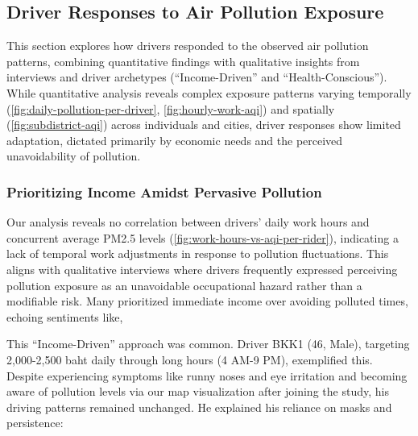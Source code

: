 \subsection{Driver Responses to Air Pollution Exposure}
This section explores how drivers responded to the observed air pollution patterns, combining quantitative findings with qualitative insights from interviews and driver archetypes (``Income-Driven'' and ``Health-Conscious'').
While quantitative analysis reveals complex exposure patterns varying temporally (\autoref{fig:daily-pollution-per-driver}, \autoref{fig:hourly-work-aqi}) and spatially (\autoref{fig:subdistrict-aqi}) across individuals and cities,
driver responses show limited adaptation, dictated primarily by economic needs and the perceived unavoidability of pollution.

\subsubsection{Prioritizing Income Amidst Pervasive Pollution}
Our analysis reveals no correlation between drivers' daily work hours and concurrent average PM2.5 levels (\autoref{fig:work-hours-vs-aqi-per-rider}), indicating a lack of temporal work adjustments in response to pollution fluctuations.
This aligns with qualitative interviews where drivers frequently expressed perceiving pollution exposure as an unavoidable occupational hazard rather than a modifiable risk.
Many prioritized immediate income over avoiding polluted times, echoing sentiments like,

\qpadding
{}

\qpadding
{}
\qpadding

This ``Income-Driven'' approach was common.
Driver BKK1 (46, Male), targeting 2,000-2,500 baht daily through long hours (4 AM-9 PM), exemplified this.
Despite experiencing symptoms like runny noses and eye irritation and becoming aware of pollution levels via our map visualization after joining the study, his driving patterns remained unchanged.
He explained his reliance on masks and persistence:

